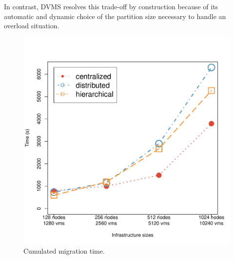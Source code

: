 In contrast, DVMS resolves this trade-off by construction because of its
automatic and dynamic choice of the partition size necessary to handle
an overload situation.





\begin{figure}[ht]
\begin{center}
    \includegraphics[width=.65\linewidth]{figures/experiments/migration_time.pdf}
    \caption{Cumulated migration time.}
\end{center}
\label{fig:cumulated_migration_time}
\end{figure}

